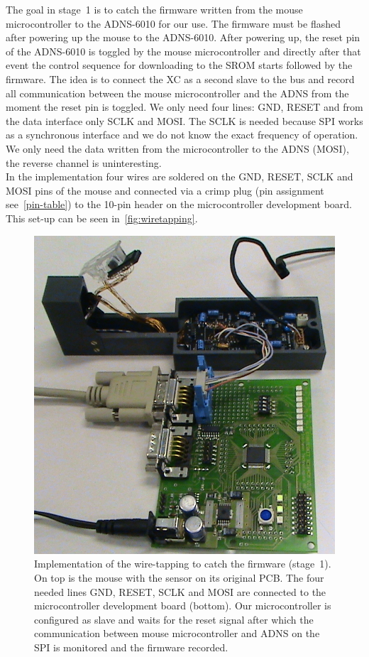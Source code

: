 \documentclass[12pt,a4paper]{article}
\begin{document}
The goal in stage~1 is to catch the firmware written from the mouse microcontroller to the ADNS-6010 for our use.
The firmware must be flashed after powering up the mouse to the ADNS-6010.
After powering up, the reset pin of the ADNS-6010 is toggled by the mouse microcontroller and directly after that event the control sequence for downloading to the SROM starts followed by the firmware.
The idea is to connect the XC as a second slave to the bus and record all communication between the mouse microcontroller and the ADNS from the moment the reset pin is toggled.
We only need four lines: GND, RESET and from the data interface only SCLK and MOSI. 
The SCLK is needed because SPI works as a synchronous interface and we do not know the exact frequency of operation.
We only need the data written from the microcontroller to the ADNS (MOSI), the reverse channel is uninteresting.\\
In the implementation four wires are soldered on the GND, RESET, SCLK and MOSI pins of the mouse and connected via a crimp plug (pin assignment see~\autoref{pin-table}) to the 10-pin header on the microcontroller development board. 
This set-up can be seen in~\autoref{fig:wiretapping}.

\begin{figure}[htbp]
\begin{center}
\includegraphics[width=0.8\columnwidth]{figures/wiretapping.png}
\caption{\label{fig:wiretapping}
Implementation of the wire-tapping to catch the firmware (stage~1).
On top is the mouse with the sensor on its original PCB.
The four needed lines GND, RESET, SCLK and MOSI are connected to the microcontroller development board (bottom).
Our microcontroller is configured as slave and waits for the reset signal after which the communication between mouse microcontroller and ADNS on the SPI is monitored and the firmware recorded.
}
\end{center}
\end{figure}
\end{document}
